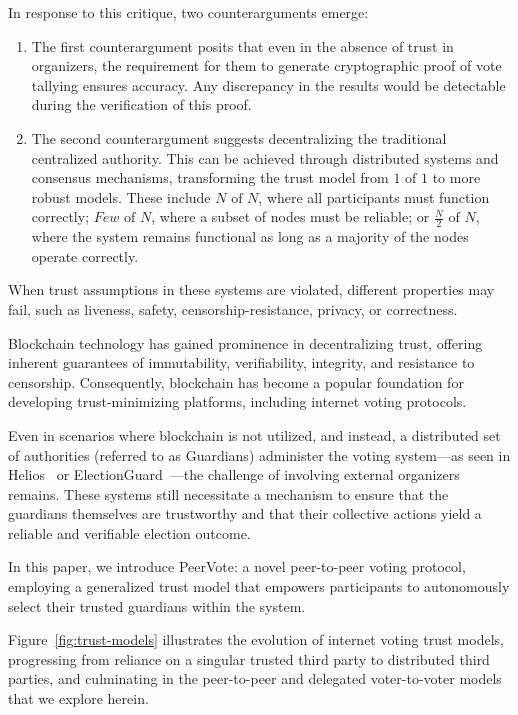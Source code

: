 \documentclass[runningheads]{llncs}
\begin{document}
In response to this critique, two counterarguments emerge:
\begin{enumerate}
\item The first counterargument posits that even in the absence of trust in organizers, the requirement for them to generate cryptographic proof of vote tallying ensures accuracy. Any discrepancy in the results would be detectable during the verification of this proof.
\item The second counterargument suggests decentralizing the traditional centralized authority. This can be achieved through distributed systems and consensus mechanisms, transforming the trust model from $1 \textrm{ of } 1$ to more robust models. These include $N \textrm{ of } N$, where all participants must function correctly; $Few \textrm{ of } N$, where a subset of nodes must be reliable; or $\frac{N}{2} \textrm{ of } N$, where the system remains functional as long as a majority of the nodes operate correctly.
\end{enumerate}

When trust assumptions in these systems are violated, different properties may fail, such as liveness, safety, censorship-resistance, privacy, or correctness.

Blockchain technology has gained prominence in decentralizing trust, offering inherent guarantees of immutability, verifiability, integrity, and resistance to censorship. Consequently, blockchain has become a popular foundation for developing trust-minimizing platforms, including internet voting protocols.

Even in scenarios where blockchain is not utilized, and instead, a distributed set of authorities (referred to as Guardians) administer the voting system—as seen in Helios~\cite{adidaHeliosWebbasedOpenAudit2008} or ElectionGuard~\cite{ElectionGuard}—the challenge of involving external organizers remains. These systems still necessitate a mechanism to ensure that the guardians themselves are trustworthy and that their collective actions yield a reliable and verifiable election outcome.

In this paper, we introduce PeerVote: a novel peer-to-peer voting protocol, employing a generalized trust model that empowers participants to autonomously select their trusted guardians within the system. 

Figure~\ref{fig:trust-models} illustrates the evolution of internet voting trust models, progressing from reliance on a singular trusted third party to distributed third parties, and culminating in the peer-to-peer and delegated voter-to-voter models that we explore herein.
\end{document}
